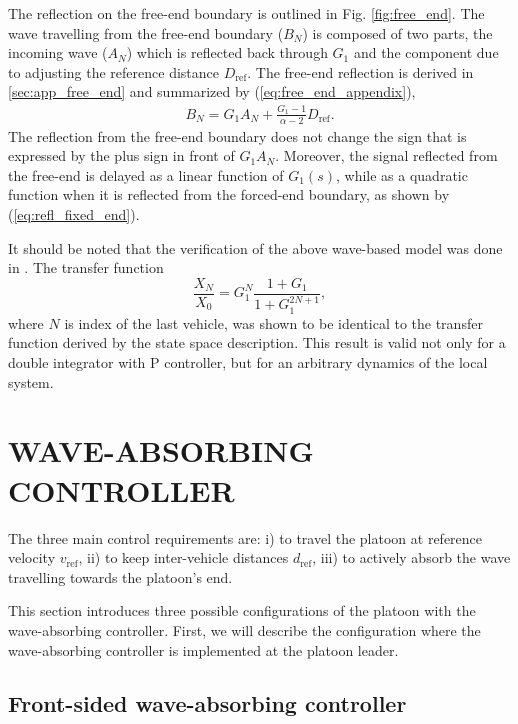 \documentclass[final,5p,times,twocolumn]{elsarticle}
\begin{document}
The reflection on the free-end boundary is outlined in Fig. \ref{fig:free_end}. The wave travelling from the free-end boundary ($B_N$) is composed of two parts, the incoming wave ($A_N$) which is reflected back through $G_1$ and the component due to adjusting the reference distance $D_{\text{ref}}$. The free-end reflection is derived in \ref{sec:app_free_end} and summarized by (\ref{eq:free_end_appendix}),
\begin{align}
B_N = G_1 A_N + \frac{G_1 -1}{\alpha-2} D_{\text{ref}}.
\label{eq:refl_free_end}
\end{align}
The reflection from the free-end boundary does not change the sign that is expressed by the plus sign in front of $G_1 A_N$. Moreover, the signal reflected from the free-end is delayed as a linear function of $G_{1}(s)$, while as a quadratic function when it is reflected from the forced-end boundary, as shown by (\ref{eq:refl_fixed_end}).

It should be noted that the verification of the above wave-based model was done in \cite{OConnor2007}. The transfer function
\begin{equation}
  \frac{X_N}{X_0} = G_1^N \frac{1+G_1}{1+G_1^{2N+1}},
\end{equation}
where $N$ is index of the last vehicle, was shown to be identical to the transfer function derived by the state space description. This result is valid not only for a double integrator with P controller, but for an arbitrary dynamics of the local system.

\section{WAVE-ABSORBING CONTROLLER}
\label{sec:wave-based_platoon_control}

The three main control requirements are: i) to travel the platoon at reference velocity $v_{\text{ref}}$, ii) to keep inter-vehicle distances $d_{\text{ref}}$, iii) to actively absorb the wave travelling towards the platoon's end.

This section introduces three possible configurations of the platoon with the wave-absorbing controller. First, we will describe the configuration where the wave-absorbing controller is implemented at the platoon leader.

\subsection{Front-sided wave-absorbing controller}
\label{sec:driving_ref_vel}
\end{document}
